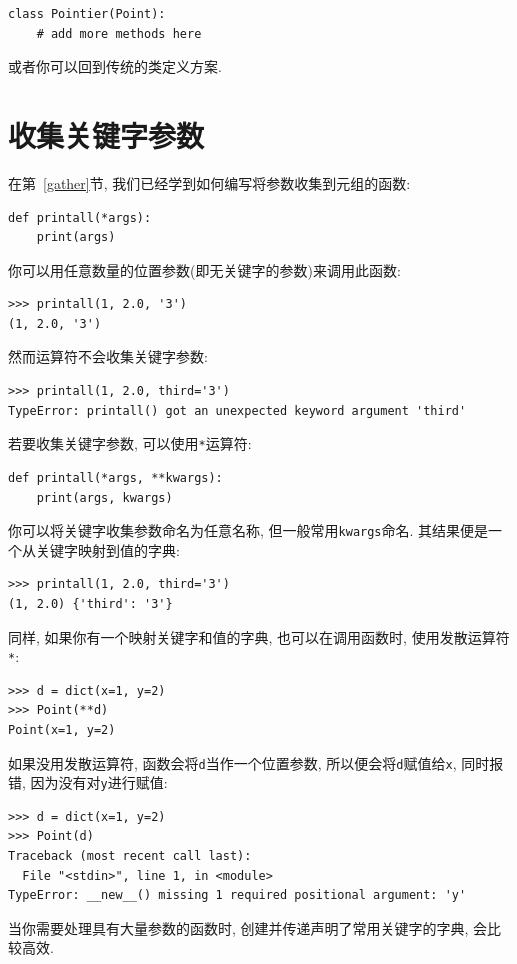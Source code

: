 \documentclass[10pt]{book}
\begin{document}
\begin{verbatim}
class Pointier(Point):
    # add more methods here
\end{verbatim}

或者你可以回到传统的类定义方案. 


\section{收集关键字参数}

在第~\ref{gather}节, 我们已经学到如何编写将参数收集到元组的函数:

\begin{verbatim}
def printall(*args):
    print(args)
\end{verbatim}
%
你可以用任意数量的位置参数(即无关键字的参数)来调用此函数:

\begin{verbatim}
>>> printall(1, 2.0, '3')
(1, 2.0, '3')
\end{verbatim}
%
然而{\tt *}运算符不会收集关键字参数:

\begin{verbatim}
>>> printall(1, 2.0, third='3')
TypeError: printall() got an unexpected keyword argument 'third'
\end{verbatim}
%
若要收集关键字参数, 可以使用{\tt **}运算符:

\begin{verbatim}
def printall(*args, **kwargs):
    print(args, kwargs)
\end{verbatim}
%
你可以将关键字收集参数命名为任意名称, 但一般常用{\tt kwargs}命名. 
其结果便是一个从关键字映射到值的字典:

\begin{verbatim}
>>> printall(1, 2.0, third='3')
(1, 2.0) {'third': '3'}
\end{verbatim}
%
同样, 如果你有一个映射关键字和值的字典, 也可以在调用函数时, 
使用发散运算符{\tt **}:

\begin{verbatim}
>>> d = dict(x=1, y=2)
>>> Point(**d)
Point(x=1, y=2)
\end{verbatim}
%
如果没用发散运算符, 函数会将{\tt d}当作一个位置参数, 
所以便会将{\tt d}赋值给{\tt x}, 同时报错, 因为没有对{\tt y}进行赋值:

\begin{verbatim}
>>> d = dict(x=1, y=2)
>>> Point(d)
Traceback (most recent call last):
  File "<stdin>", line 1, in <module>
TypeError: __new__() missing 1 required positional argument: 'y'
\end{verbatim}
%
当你需要处理具有大量参数的函数时, 
创建并传递声明了常用关键字的字典, 会比较高效. 
\end{document}
